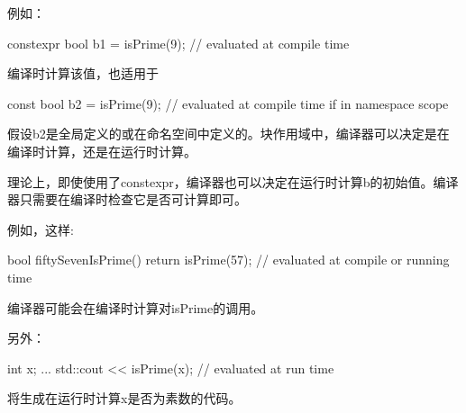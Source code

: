 例如：

\begin{cpp}
constexpr bool b1 = isPrime(9); // evaluated at compile time
\end{cpp}

编译时计算该值，也适用于

\begin{cpp}
const bool b2 = isPrime(9); // evaluated at compile time if in namespace scope
\end{cpp}

假设b2是全局定义的或在命名空间中定义的。块作用域中，编译器可以决定是在编译时计算，还是在运行时计算。

\begin{notice}理论上，即使使用了constexpr，编译器也可以决定在运行时计算b的初始值。编译器只需要在编译时检查它是否可计算即可。
\end{notice}

例如，这样:

\begin{cpp}
bool fiftySevenIsPrime() {
	return isPrime(57); // evaluated at compile or running time
}
\end{cpp}

编译器可能会在编译时计算对isPrime的调用。

另外：

\begin{cpp}
int x;
...
std::cout << isPrime(x); // evaluated at run time
\end{cpp}

将生成在运行时计算x是否为素数的代码。

